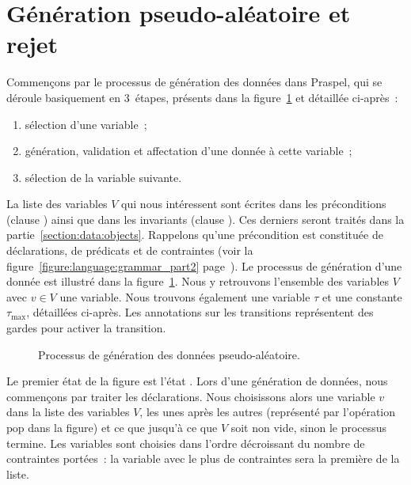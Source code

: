 \section{Génération pseudo-aléatoire et rejet}
\label{section:data:random}

Commençons par le processus de génération des données dans Praspel, qui se
déroule basiquement en 3~étapes, présents dans la
figure~\ref{figure:data:process} et détaillée ci-après~:

\begin{enumerate}

\item sélection d'une variable~;

\item génération, validation et affectation d'une donnée à cette variable~;

\item sélection de la variable suivante.

\end{enumerate}

La liste des variables $V$ qui nous intéressent sont écrites dans les
préconditions (clause \arequires) ainsi que dans les invariants (clause
\ainvariant). Ces derniers seront traités dans la
partie~\ref{section:data:objects}. Rappelons qu'une précondition est constituée
de déclarations, de prédicats et de contraintes (voir la
figure~\ref{figure:language:grammar_part2}
page~\pageref{figure:language:grammar_part2}). Le processus de génération d'une
donnée est illustré dans la figure~\ref{figure:data:process}. Nous y retrouvons
l'ensemble des variables $V$ avec $v \in V$ une variable. Nous trouvons
également une variable $\tau$ et une constante $\tau_\mathrm{max}$, détaillées
ci-après. Les annotations sur les transitions représentent des gardes pour
activer la transition.
%
\begin{figure}


\caption{\label{figure:data:process} Processus de génération des données
pseudo-aléatoire.}

\end{figure}

Le premier état de la figure est l'état . Lors d'une génération de
données, nous commençons par traiter les déclarations. Nous choisissons alors
une variable $v$ dans la liste des variables $V$, les unes après les autres
(représenté par l'opération $\mathrm{pop}$ dans la figure) et ce que jusqu'à ce
que $V$ soit non vide, sinon le processus termine. Les variables sont choisies
dans l'ordre décroissant du nombre de contraintes portées~: la variable avec le
plus de contraintes sera la première de la liste.

